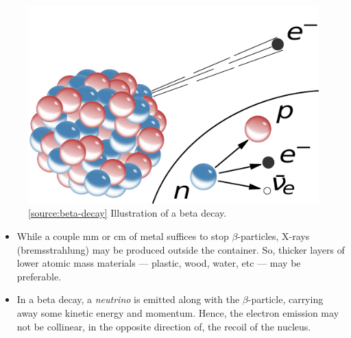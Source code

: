 \documentclass[oneside]{book}
\begin{document}
\begin{itemize}
\end{itemize}
    \begin{minipage}{0.5\textwidth}
        \begin{figure}[H]
            \centering
            \includegraphics[width=\textwidth]{../images/Beta-minus_Decay.pdf}
            \caption{\ref{source:beta-decay} Illustration of a beta decay.}
            \label{fig-beta-decay}
        \end{figure}
    \end{minipage}%
    \begin{minipage}{0.5\textwidth}
        \begin{itemize}
            \item While a couple mm or cm of metal suffices to stop \(\beta\)-particles, X-rays (bremsstrahlung) may be produced outside the container. So, thicker layers of lower atomic mass materials --- plastic, wood, water, etc --- may be preferable.
            \item In a beta decay, a \emph{neutrino} is emitted along with the \(\beta\)-particle, carrying away some kinetic energy and momentum. Hence, the electron emission may not be collinear, in the opposite direction of, the recoil of the nucleus.
        \end{itemize}
    \end{minipage}
\end{document}
